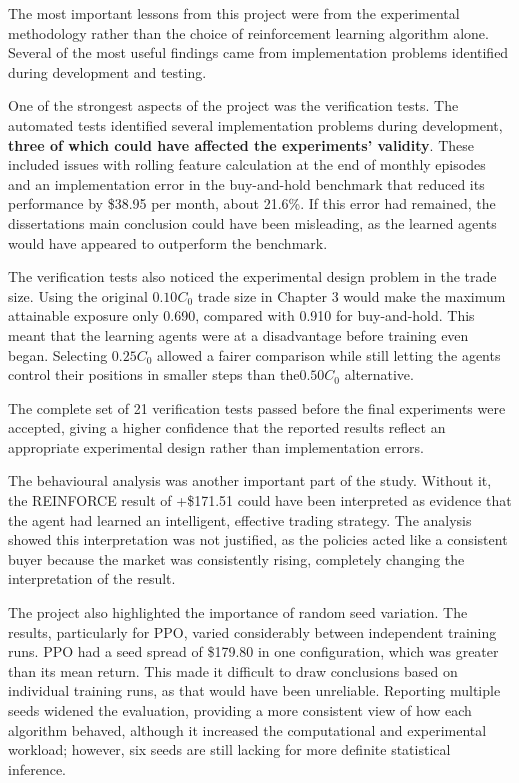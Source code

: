 The most important lessons from this project were from the experimental
methodology rather than the choice of reinforcement learning algorithm
alone. Several of the most useful findings came from implementation
problems identified during development and testing.

One of the strongest aspects of the project was the verification tests.
The automated tests identified several implementation problems during
development, \textbf{three of which could have affected the
experiments' validity}. These
included issues with rolling feature calculation at the end of monthly
episodes and an implementation error in the buy-and-hold benchmark that
reduced its performance by \$38.95 per month, about 21.6\%. If this
error had remained, the dissertation\textquotesingle s main conclusion
could have been misleading, as the learned agents would have appeared to
outperform the benchmark.

The verification tests also noticed the experimental design problem in
the trade size. Using the original \(0.10C_{0}\) trade size in Chapter 3
would make the maximum attainable exposure only 0.690, compared with
0.910 for buy-and-hold. This meant that the learning agents were at a
disadvantage before training even began. Selecting \(0.25C_{0}\) allowed
a fairer comparison while still letting the agents control their
positions in smaller steps than the\(0.50C_{0}\) alternative.

The complete set of 21 verification tests passed before the final
experiments were accepted, giving a higher confidence that the reported
results reflect an appropriate experimental design rather than
implementation errors.

The behavioural analysis was another important part of the study.
Without it, the REINFORCE result of +\$171.51 could have been
interpreted as evidence that the agent had learned an intelligent,
effective trading strategy. The analysis showed this interpretation was
not justified, as the policies acted like a consistent buyer because the
market was consistently rising, completely changing the interpretation
of the result.

The project also highlighted the importance of random seed variation.
The results, particularly for PPO, varied considerably between
independent training runs. PPO had a seed spread of \$179.80 in one
configuration, which was greater than its mean return. This made it
difficult to draw conclusions based on individual training runs, as that
would have been unreliable. Reporting multiple seeds widened the
evaluation, providing a more consistent view of how each algorithm
behaved, although it increased the computational and experimental
workload; however, six seeds are still lacking for more definite
statistical inference.

